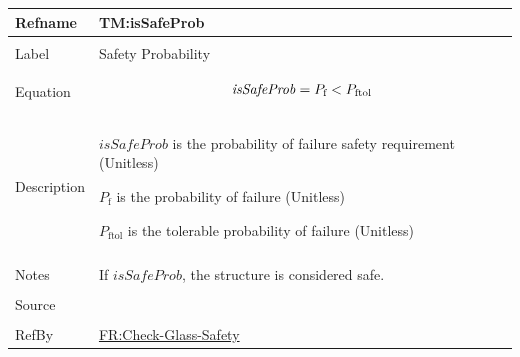 \documentclass[12pt]{article}
\newcommand{\lt}{\ensuremath <}
\begin{document}
\vspace{\baselineskip}
\noindent
\begin{minipage}{\textwidth}
\begin{tabular}{>{\raggedright}p{}>{\raggedright\arraybackslash}p{}}
\toprule \textbf{Refname} & \textbf{TM:isSafeProb}
\label{TM:isSafeProb}
\\ \midrule \\
Label & Safety Probability
        
\\ \midrule \\
Equation & \begin{displaymath}
           \mathit{isSafeProb}={P_{\text{f}}}\lt{}{P_{\text{f}\text{tol}}}
           \end{displaymath}
\\ \midrule \\
Description & \begin{symbDescription}
              \item{$\mathit{isSafeProb}$ is the probability of failure safety requirement (Unitless)}
              \item{${P_{\text{f}}}$ is the probability of failure (Unitless)}
              \item{${P_{\text{f}\text{tol}}}$ is the tolerable probability of failure (Unitless)}
              \end{symbDescription}
\\ \midrule \\
Notes & If $\mathit{isSafeProb}$, the structure is considered safe.
        
\\ \midrule \\
Source & \cite{astm2009}
         
\\ \midrule \\
RefBy & \hyperref[checkGlassSafety]{FR:Check-Glass-Safety}
        
\\ \bottomrule
\end{tabular}
\end{minipage}
\vspace{\baselineskip}
\noindent
\end{document}
